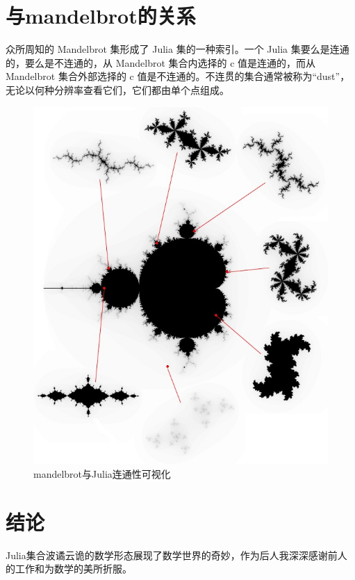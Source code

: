 \documentclass{ctexart}
\begin{document}
\section{与mandelbrot的关系}
众所周知的 Mandelbrot 集形成了 Julia 集的一种索引。一个 Julia 集要么是连通的，要么是不连通的，从 Mandelbrot 集合内选择的 c 值是连通的，而从 Mandelbrot 集合外部选择的 c 值是不连通的。不连贯的集合通常被称为“dust”，无论以何种分辨率查看它们，它们都由单个点组成。

\begin{figure}[h]
\centering
\includegraphics[width=0.4\linewidth]{julia_mandel.jpg}
\caption{mandelbrot与Julia连通性可视化}
\label{fig:output2}
\end{figure}
\section{结论}
Julia集合波谲云诡的数学形态展现了数学世界的奇妙，作为后人我深深感谢前人的工作和为数学的美所折服。



\end{document}
